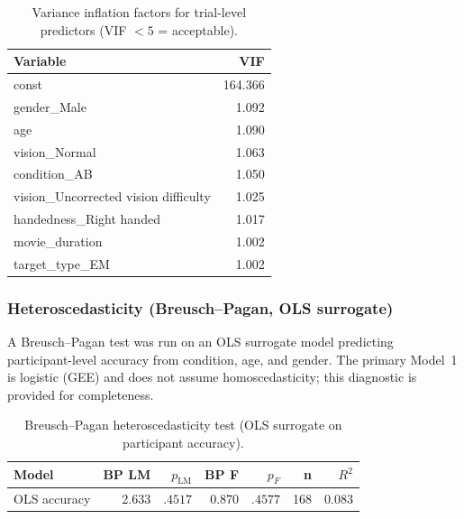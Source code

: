 \documentclass[12pt,a4paper]{article}
\begin{document}
\begin{table}[H]
\centering
\small
\begin{tabular}{lr}
\hline
\textbf{Variable} & \textbf{VIF} \\
\hline

    const & 164.366 \\

    gender\_Male & 1.092 \\

    age & 1.090 \\

    vision\_Normal & 1.063 \\

    condition\_AB & 1.050 \\

    vision\_Uncorrected vision difficulty & 1.025 \\

    handedness\_Right handed & 1.017 \\

    movie\_duration & 1.002 \\

    target\_type\_EM & 1.002 \\

\hline
\end{tabular}
\caption{Variance inflation factors for trial-level predictors (VIF $< 5$ = acceptable).}
\end{table}


\subsubsection{Heteroscedasticity (Breusch--Pagan, OLS surrogate)}
A Breusch--Pagan test was run on an OLS surrogate model predicting participant-level accuracy
from condition, age, and gender. The primary Model~1 is logistic (GEE) and does not assume
homoscedasticity; this diagnostic is provided for completeness.

\begin{table}[H]
\centering
\small
\begin{tabular}{lrrrrrr}
\hline
\textbf{Model} & \textbf{BP LM} & \textbf{$p_\text{LM}$} & \textbf{BP F} & \textbf{$p_F$} & \textbf{n} & \textbf{$R^2$} \\
\hline
OLS accuracy & 2.633 & $.4517$ & 0.870 & $.4577$ & 168 & 0.083 \\
\hline
\end{tabular}
\caption{Breusch--Pagan heteroscedasticity test (OLS surrogate on participant accuracy).}
\end{table}
\end{document}
